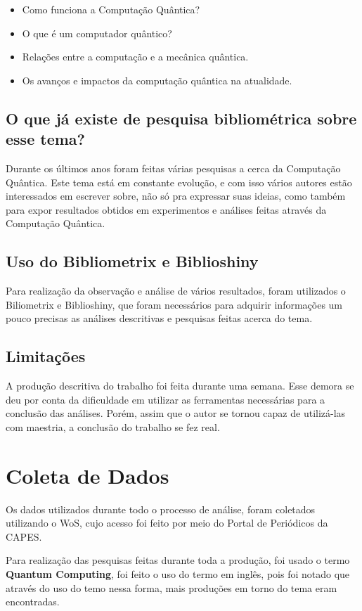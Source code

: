 \begin{itemize}
    \item Como funciona a Computação Quântica?
    \item O que é um computador quântico?
    \item Relações entre a computação e a mecânica quântica.
    \item Os avanços e impactos da computação quântica na atualidade.
\end{itemize}

\subsection{O que já existe de pesquisa bibliométrica sobre esse tema?}

Durante os últimos anos foram feitas várias pesquisas a cerca da Computação Quântica. Este tema está em constante evolução, e com isso vários autores estão interessados em escrever sobre, não só pra expressar suas ideias, como também para expor resultados obtidos em experimentos e análises feitas através da Computação Quântica.

\subsection{Uso do Bibliometrix e Biblioshiny}
Para realização da observação e análise de vários resultados, foram utilizados o Biliometrix e Biblioshiny, que foram necessários para adquirir informações um pouco precisas as análises descritivas e pesquisas feitas acerca do tema.

\subsection{Limitações}
A produção descritiva do trabalho foi feita durante uma semana. Esse demora se deu por conta da dificuldade em utilizar as ferramentas necessárias para a conclusão das análises. Porém, assim que o autor se tornou capaz de utilizá-las com maestria, a conclusão do trabalho se fez real.

\section{Coleta de Dados}

Os dados utilizados durante todo o processo de análise, foram coletados utilizando o WoS, cujo acesso foi feito por meio do Portal de Periódicos da CAPES.

Para realização das pesquisas feitas durante toda a produção, foi usado o termo \textbf{Quantum Computing}, foi feito o uso do termo em inglês, pois foi notado que através do uso do temo nessa forma, mais produções em torno do tema eram encontradas.

